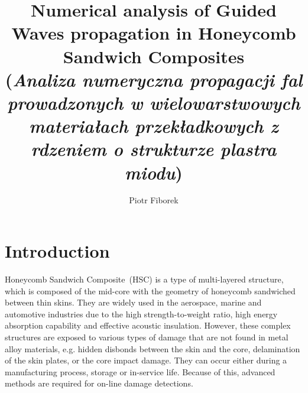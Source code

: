 \documentclass[a4paper,12pt]{article}
\author{Piotr Fiborek}
\title{Numerical analysis of Guided Waves propagation in Honeycomb Sandwich Composites\\
(\textit{Analiza numeryczna propagacji fal prowadzonych w wielowarstwowych materia\l{}ach przek\l{}adkowych z rdzeniem o strukturze plastra miodu})}
\begin{document}
\maketitle
\thispagestyle{empty}
\section{Introduction}
\label{sec:intro}
Honeycomb Sandwich Composite~(HSC) is a type of multi-layered structure, which 
is composed of the mid-core with the geometry of honeycomb sandwiched between 
thin skins.
They are widely used in the aerospace, marine and automotive industries due to 
the high strength-to-weight ratio, high energy absorption capability and 
effective acoustic insulation.
However, these complex structures are exposed to various types of damage that are not found in metal alloy materials, e.g. hidden disbonds between the skin and the core, delamination of the skin plates, or the core impact damage.
They can occur either during a manufacturing process, storage or in-service life.
Because of this, advanced methods are required for on-line damage detections.
\end{document}
